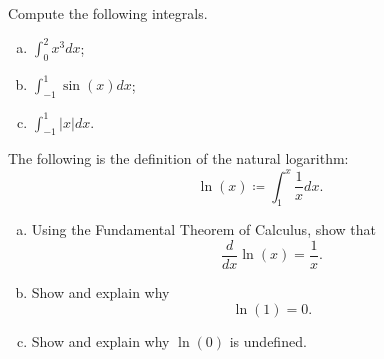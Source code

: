    \begin{problem}
    Compute the following integrals.
    \begin{enumerate}[(a)]
        \item $\displaystyle{\int_0^2 x^3 dx}$;
        \item $\displaystyle{\int_{-1}^1 \sin(x)dx}$;
        \item $\displaystyle{\int_{-1}^1 |x|dx}$.
    \end{enumerate}
    \end{problem}
    
    \begin{problem*}
    The following is the definition of the natural logarithm:
    \[
    \ln(x)\coloneqq\int_1^x \frac{1}{x}dx.
    \]
    \begin{enumerate}[(a)]
        \item Using the Fundamental Theorem of Calculus, show that
        \[
        \frac{d}{dx}\ln(x)=\frac{1}{x}.
        \]
        \item Show and explain why
        \[
        \ln(1)=0.
        \]
        \item Show and explain why $\ln(0)$ is undefined.
    \end{enumerate}
    \end{problem*}
    
    
    
    

    

